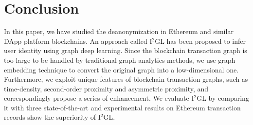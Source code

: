 
\section{Conclusion}
\label{sec:conclusion}
In this paper, we have studied the deanonymization in Ethereum and similar DApp platform blockchains. An approach called I$^2$GL has been proposed to infer user identity using graph deep learning. Since the blockchain transaction graph is too large to be handled by traditional graph analytics methods, we use graph embedding technique to convert the original graph into a low-dimensional one. Furthermore, we exploit unique features of blockchain transaction graphs, such as time-density, second-order proximity and asymmetric proximity, and correspondingly propose a series of enhancement. We evaluate I$^2$GL by comparing it with three state-of-the-art and experimental results on Ethereum transaction records show the superiority of I$^2$GL.